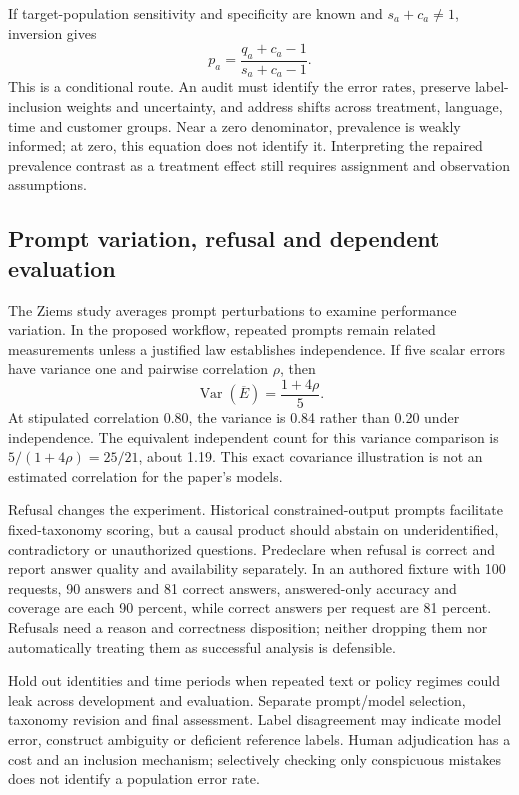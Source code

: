 If target-population sensitivity and specificity are known and $s_a+c_a\ne1$, inversion gives
\[
 p_a=\frac{q_a+c_a-1}{s_a+c_a-1}.
\]
This is a conditional route. An audit must identify the error rates, preserve label-inclusion weights and uncertainty, and address shifts across treatment, language, time and customer groups. Near a zero denominator, prevalence is weakly informed; at zero, this equation does not identify it. Interpreting the repaired prevalence contrast as a treatment effect still requires assignment and observation assumptions.\citep{exec24_css_knowledge_reference}

\subsection{Prompt variation, refusal and dependent evaluation}
The Ziems study averages prompt perturbations to examine performance variation. In the proposed workflow, repeated prompts remain related measurements unless a justified law establishes independence. If five scalar errors have variance one and pairwise correlation $\rho$, then
\[
 \operatorname{Var}(\overline E)=\frac{1+4\rho}{5}.
\]
At stipulated correlation 0.80, the variance is 0.84 rather than 0.20 under independence. The equivalent independent count for this variance comparison is $5/(1+4\rho)=25/21$, about 1.19. This exact covariance illustration is not an estimated correlation for the paper's models.\citep{exec24_css_original,exec24_css_knowledge_reference}

Refusal changes the experiment. Historical constrained-output prompts facilitate fixed-taxonomy scoring, but a causal product should abstain on underidentified, contradictory or unauthorized questions. Predeclare when refusal is correct and report answer quality and availability separately. In an authored fixture with 100 requests, 90 answers and 81 correct answers, answered-only accuracy and coverage are each 90 percent, while correct answers per request are 81 percent. Refusals need a reason and correctness disposition; neither dropping them nor automatically treating them as successful analysis is defensible.\citep{exec24_css_original,exec24_css_knowledge_reference}

Hold out identities and time periods when repeated text or policy regimes could leak across development and evaluation. Separate prompt/model selection, taxonomy revision and final assessment. Label disagreement may indicate model error, construct ambiguity or deficient reference labels. Human adjudication has a cost and an inclusion mechanism; selectively checking only conspicuous mistakes does not identify a population error rate.\citep{exec24_css_knowledge_reference}

